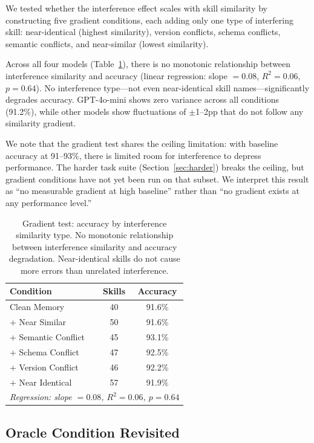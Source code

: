 \documentclass[11pt]{article}
\begin{document}
We tested whether the interference effect scales with skill similarity by constructing five gradient conditions, each adding only one type of interfering skill: near-identical (highest similarity), version conflicts, schema conflicts, semantic conflicts, and near-similar (lowest similarity).

Across all four models (Table~\ref{tab:gradient}), there is no monotonic relationship between interference similarity and accuracy (linear regression: slope $= 0.08$, $R^2 = 0.06$, $p = 0.64$). No interference type---not even near-identical skill names---significantly degrades accuracy. GPT-4o-mini shows zero variance across all conditions (91.2\%), while other models show fluctuations of $\pm$1--2pp that do not follow any similarity gradient.

We note that the gradient test shares the ceiling limitation: with baseline accuracy at 91--93\%, there is limited room for interference to depress performance. The harder task suite (Section~\ref{sec:harder}) breaks the ceiling, but gradient conditions have not yet been run on that subset. We interpret this result as ``no measurable gradient at high baseline'' rather than ``no gradient exists at any performance level.''

\begin{table}[t]
\centering
\small
\begin{tabular}{lcc}
\toprule
\textbf{Condition} & \textbf{Skills} & \textbf{Accuracy} \\
\midrule
Clean Memory & 40 & 91.6\% \\
+ Near Similar & 50 & 91.6\% \\
+ Semantic Conflict & 45 & 93.1\% \\
+ Schema Conflict & 47 & 92.5\% \\
+ Version Conflict & 46 & 92.2\% \\
+ Near Identical & 57 & 91.9\% \\
\midrule
\multicolumn{3}{l}{\textit{Regression: slope $= 0.08$, $R^2 = 0.06$, $p = 0.64$}} \\
\bottomrule
\end{tabular}
\caption{Gradient test: accuracy by interference similarity type. No monotonic relationship between interference similarity and accuracy degradation. Near-identical skills do not cause more errors than unrelated interference.}
\label{tab:gradient}
\end{table}

\subsection{Oracle Condition Revisited}
\end{document}
